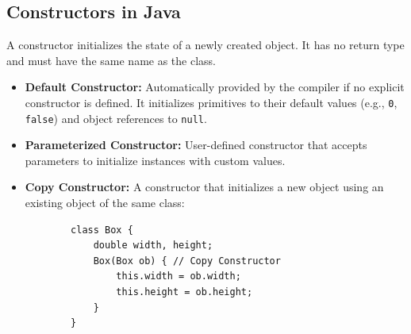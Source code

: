 \documentclass[12pt,a4paper]{article}
\begin{document}
\begin{tcolorbox}[tikzbox, title={Object Creation and Reference Linkage}]
\centering
{}
\end{tcolorbox}

\subsection{Constructors in Java}
A constructor initializes the state of a newly created object. It has no return type and must have the same name as the class.

\begin{itemize}[leftmargin=*, itemsep=4pt]
  \item \textbf{Default Constructor:} Automatically provided by the compiler if no explicit constructor is defined. It initializes primitives to their default values (e.g., \texttt{0}, \texttt{false}) and object references to \texttt{null}.
  \item \textbf{Parameterized Constructor:} User-defined constructor that accepts parameters to initialize instances with custom values.
  \item \textbf{Copy Constructor:} A constructor that initializes a new object using an existing object of the same class:
        \begin{verbatim}
        class Box {
            double width, height;
            Box(Box ob) { // Copy Constructor
                this.width = ob.width;
                this.height = ob.height;
            }
        }
        \end{verbatim}
\end{itemize}
\end{document}
